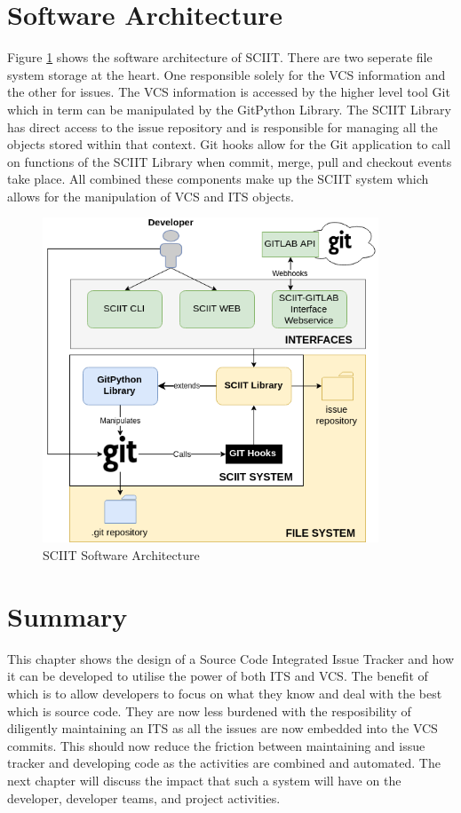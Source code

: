 \documentclass{mproj}
\begin{document}
\section{Software Architecture}

Figure \ref{fig:sciit-software-arch} shows the software architecture of SCIIT. There are two seperate file system storage at the heart. One responsible solely for the VCS information and the other for issues. The VCS information is accessed by the higher level tool Git which in term can be manipulated by the GitPython Library. The SCIIT Library has direct access to the issue repository and is responsible for managing all the objects stored within that context. Git hooks allow for the Git application to call on functions of the SCIIT Library when commit, merge, pull and checkout events take place. All combined these components make up the SCIIT system which allows for the manipulation of VCS and ITS objects.


\begin{figure}[t]
\caption{SCIIT Software Architecture}
\label{fig:sciit-software-arch}
\centering
\includegraphics[width=10cm]{sciit-software-arch}
\end{figure}





\section{Summary}

This chapter shows the design of a Source Code Integrated Issue Tracker and how it can be developed to utilise the power of both ITS and VCS. The benefit of which is to allow developers to focus on what they know and deal with the best which is source code. They are now less burdened with the resposibility of diligently maintaining an ITS as all the issues are now embedded into the VCS  commits. This should now reduce the friction between maintaining and issue tracker and developing code as the activities are combined and automated. The next chapter will discuss the impact that such a system will have on the developer, developer teams, and project activities.
\end{document}
